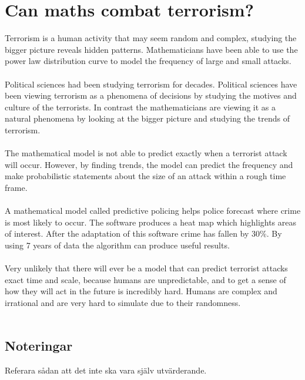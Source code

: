 \chapter{Can maths combat terrorism?}
Terrorism is a human activity that may seem random and complex, studying the bigger picture reveals hidden patterns. 
Mathematicians have been able to use the power law distribution curve to model the frequency of large and small attacks.\\\\
Political sciences had been studying terrorism for decades. Political sciences have been viewing terrorism as a phenomena of decisions by studying the motives and culture of the terrorists. In contrast the mathematicians are viewing it as a natural phenomena by looking at the bigger picture and studying the trends of terrorism. \\\\
The mathematical model is not able to predict exactly when a terrorist attack will occur.
However, by finding trends, the model can predict the frequency and make probabilistic statements about the size of an attack within a rough time frame.
\\\\
A mathematical model called predictive policing helps police forecast where crime is most likely to occur. The software produces a heat map which highlights areas of interest. After the adaptation of this software crime has fallen by 30\%. By using 7 years of data the algorithm can produce useful results.\\\\
Very unlikely that there will ever be a model that can predict terrorist attacks exact time and scale, because humans are unpredictable, and to get a sense of how they will act in the future is incredibly hard. Humans are complex and irrational and are very hard to simulate due to their randomness. \\\\
\section{Noteringar}
Referara sådan att det inte ska vara själv utvärderande.